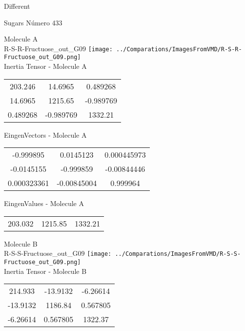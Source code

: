 \begin{center}
\vtab
\vtab
\textcolor{NavyBlue}{\Large Different}
\end{center}

 \newpage

\vtab[-2cm]
\begin{center}
{\large Sugars \tab Número 433}
\end{center}
\begin{multicols}{2}
\begin{center}

Molecule A \\ 
R-S-R-Fructuose\_out\_G09
\texttt{[image: ../Comparations/ImagesFromVMD/R-S-R-Fructuose\_out\_G09.png]}
\\
Inertia Tensor - Molecule A \\
\vtab

\begin{tabular}{|c c c|}
203.246	 & 	14.6965	 & 	0.489268	 \\
14.6965	 & 	1215.65	 & 	-0.989769	 \\
0.489268	 & 	-0.989769	 & 	1332.21
\end{tabular}

\vtab
 EingenVectors - Molecule A     \\
\vtab
\begin{tabular}{|c c c|}
-0.999895	 & 	0.0145123	 & 	0.000445973	 \\
-0.0145155	 & 	-0.999859	 & 	-0.00844446	 \\
0.000323361	 & 	-0.00845004	 & 	0.999964
\end{tabular}

\vtab
 EingenValues - Molecule A     \\
\vtab
\begin{tabular}{|c c c|}
203.032	 & 	1215.85	 & 	1332.21	 \\
\end{tabular}
\columnbreak

Molecule B \\ 
R-S-S-Fructuose\_out\_G09
\texttt{[image: ../Comparations/ImagesFromVMD/R-S-S-Fructuose\_out\_G09.png]}
\\
Inertia Tensor - Molecule B \\
\vtab

\begin{tabular}{|c c c|}
214.933	 & 	-13.9132	 & 	-6.26614	 \\
-13.9132	 & 	1186.84	 & 	0.567805	 \\
-6.26614	 & 	0.567805	 & 	1322.37
\end{tabular}


\end{center}
\end{multicols}
